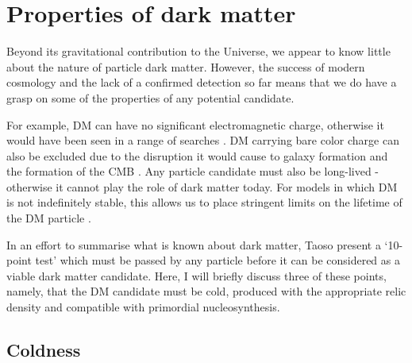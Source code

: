 


\section{Properties of dark matter}
\label{intro:sec:properties}

Beyond its gravitational contribution to the Universe, we appear to know little about the nature of particle dark matter. However, the success of modern cosmology and the lack of a confirmed detection so far means that we do have a grasp on some of the properties of any potential candidate.

For example, DM can have no significant electromagnetic charge, otherwise it would have been seen in a range of searches \cite{Kudo:2001,Perl:2001,Gninenko:2007,Melchiorri:2007}. DM carrying bare color charge can also be excluded due to the disruption it would cause to galaxy formation \cite{Natarajan:2002} and the formation of the CMB \cite{Chen:2002}. Any particle candidate must also be long-lived - otherwise it cannot play the role of dark matter today. For models in which DM is not indefinitely stable, this allows us to place stringent limits on the lifetime of the DM particle \cite{Amigo:2009,Bell:2010}. %

In an effort to summarise what is known about dark matter, Taoso \etal \cite{Taoso:2008} present a `10-point test' which must be passed by any particle before it can be considered as a viable dark matter candidate. Here, I will briefly discuss three of these points, namely, that the DM candidate must be cold, produced with the appropriate relic density and compatible with primordial nucleosynthesis.

\subsection{Coldness}

